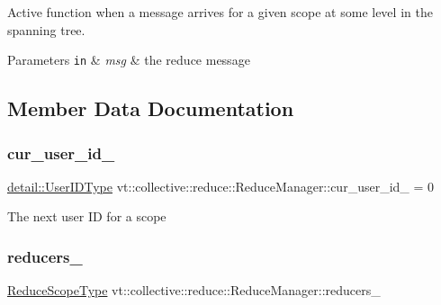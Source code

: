 Active function when a message arrives for a given scope at some level in the spanning tree. 


\begin{DoxyParams}[1]{Parameters}
\mbox{\tt in}  & {\em msg} & the reduce message \\
\hline
\end{DoxyParams}


\subsection{Member Data Documentation}
\mbox{\label{structvt_1_1collective_1_1reduce_1_1_reduce_manager_a716c66493c02898d5ac8c2b8ca62efd0}} 
\subsubsection{\texorpdfstring{cur\+\_\+user\+\_\+id\+\_\+}{cur\_user\_id\_}}
{\footnotesize\ttfamily \hyperlink{namespacevt_1_1collective_1_1reduce_1_1detail_ae82d7b96b0885b9b7dfb0104398beead}{detail\+::\+User\+I\+D\+Type} vt\+::collective\+::reduce\+::\+Reduce\+Manager\+::cur\+\_\+user\+\_\+id\+\_\+ = 0\hspace{0.3cm}{\ttfamily [private]}}

The next user ID for a scope \mbox{\label{structvt_1_1collective_1_1reduce_1_1_reduce_manager_a8226dde1ab69b8332db65f558f405ad5}} 
\subsubsection{\texorpdfstring{reducers\+\_\+}{reducers\_}}
{\footnotesize\ttfamily \hyperlink{structvt_1_1collective_1_1reduce_1_1_reduce_manager_a2c340e5d3b12e4f2df64b9c1502445cf}{Reduce\+Scope\+Type} vt\+::collective\+::reduce\+::\+Reduce\+Manager\+::reducers\+\_\+\hspace{0.3cm}{\ttfamily [private]}}

